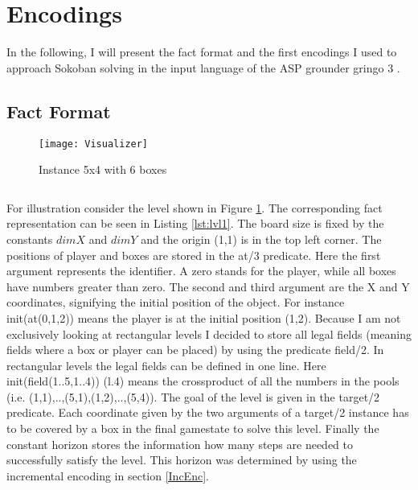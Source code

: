 \documentclass{report}
\begin{document}
\section{Encodings}
In the following, I will present the fact format and the first encodings I used to approach Sokoban solving in the input language of the ASP grounder gringo 3 \cite{Potassco}.
\subsection{Fact Format}
\begin{figure}[ht]
\centering
\texttt{[image: Visualizer]}
\caption{Instance 5x4 with 6 boxes}
\label{fig:levelVis}
\end{figure}

\begin{lstlisting}[caption={Fact Format of my third level},label=lst:lvl1]
\end{lstlisting}
For illustration consider the level shown in Figure \ref{fig:levelVis}. The corresponding fact representation can be seen in Listing \ref{lst:lvl1}. The board size is fixed by the constants $dimX$ and $dimY$ and the origin (1,1) is in the top left corner. The positions of player and boxes are stored in the at/3 predicate. Here the first argument represents the identifier. A zero stands for the player, while all boxes have numbers greater than zero. The second and third argument are the X and Y coordinates, signifying the initial position of the object. For instance init(at(0,1,2)) means the player is at the initial position (1,2). Because I am not exclusively looking at rectangular levels I decided to store all legal fields (meaning fields where a box or player can be placed) by using the predicate field/2. In rectangular levels the legal fields can be defined in one line. Here init(field(1..5,1..4)) (l.4) means the crossproduct of all the numbers in the pools (i.e. (1,1),..,(5,1),(1,2),..,(5,4)).
The goal of the level is given in the target/2 predicate. Each coordinate given by the two arguments of a target/2 instance has to be covered by a box in the final gamestate to solve this level.
Finally the constant horizon stores the information how many steps are needed to successfully satisfy the level. This horizon was determined by using the incremental encoding in section \ref{IncEnc}.
\end{document}
